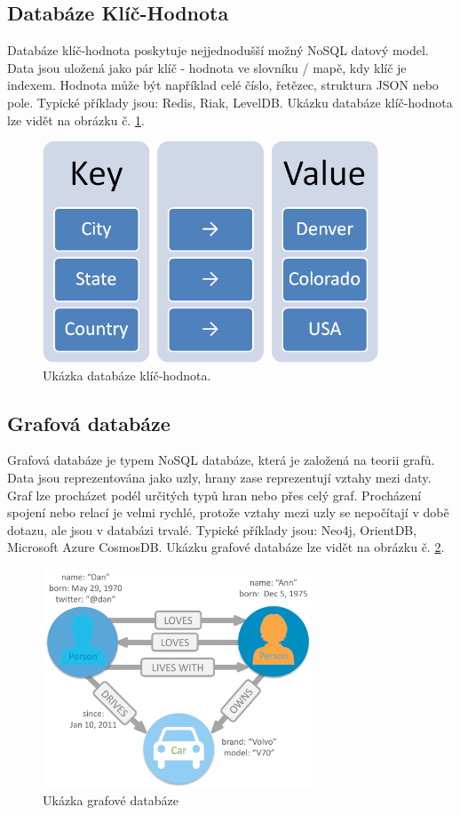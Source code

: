 \subsection{Databáze Klíč-Hodnota}
Databáze klíč-hodnota poskytuje nejjednodušší možný NoSQL datový model. Data jsou uložená jako pár klíč - hodnota ve slovníku / mapě, kdy klíč je indexem. Hodnota může být například celé číslo, řetězec, struktura \gls{JSON} nebo pole. Typické příklady jsou: Redis, Riak, LevelDB. Ukázku databáze klíč-hodnota lze vidět na obrázku č. \ref{fig:db_img_keyvalue}.
	\begin{figure}[H]
	\centering
	\includegraphics[width=10cm]{img/databaze/keyvalue_db}
	\caption{Ukázka databáze klíč-hodnota.}
	\label{fig:db_img_keyvalue}
	\end{figure}
\subsection{Grafová databáze}
Grafová databáze je typem NoSQL databáze, která je založená na teorii grafů. Data jsou reprezentována jako uzly, hrany zase reprezentují vztahy mezi daty. Graf lze procházet podél určitých typů hran nebo přes celý graf. Procházení spojení nebo relací je velmi rychlé, protože vztahy mezi uzly se nepočítají v době dotazu, ale jsou v databázi trvalé. Typické příklady jsou: Neo4j, OrientDB, Microsoft Azure CosmosDB. Ukázku grafové databáze lze vidět na obrázku č. \ref{fig:db_img_graph}.
	\begin{figure}[H]
	\centering
	\includegraphics[width=8cm]{img/databaze/graph_db}
	\caption{Ukázka grafové databáze}
	\label{fig:db_img_graph}
	\end{figure}
